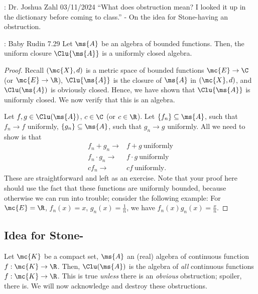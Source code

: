 \begin{nquote}{: Dr. Joshua Zahl 03/11/2024}
    ``What does obstruction mean? I looked it up in the dictionary before coming to class.'' - On the idea for Stone-\Weierstass having an obstruction.
\end{nquote}

\begin{ntheorem}{: Baby Rudin 7.29}
    Let \(\ms{A}\) be an algebra of bounded functions. Then, the uniform closure \(\Clu{\ms{A}}\)  is a uniformly closed algebra.
\end{ntheorem}
\begin{proof}
    Recall \((\mc{X},d)\) is a metric space of bounded functions \(\mc{E}\to\C\) (or \(\mc{E}\to\R\)), \(\Clu{\ms{A}}\) is the closure of \(\ms{A}\) in \((\mc{X},d)\), and \(\Clu(\ms{A})\) is obviously closed. Hence, we have shown that \(\Clu{\ms{A}}\) is uniformly closed. We now verify that this is an algebra.

    \medskip

    Let \(f,g\in\Clu(\ms{A})\), \(c\in\C\) (or \(c\in\R\)). Let \(\{f_n\}\subseteq\ms{A}\), such that \(f_n\to f\) uniformly, \(\{g_n\}\subseteq\ms{A}\), such that \(g_n\to g\) uniformly. All we need to show is that
    \begin{align*} 
        f_n+g_n\to&f+g~\text{uniformly}\\
        f_n\cdot g_n\to&f\cdot g~\text{uniformly}\\
        cf_n\to&cf~\text{uniformly}.
    \end{align*}
    These are straightforward and left as an exercise. Note that your proof here should use the fact that these functions are uniformly bounded, because otherwise we can run into trouble; consider the following example: For \(\mc{E}=\R\), \(f_n(x)=x\), \(g_n(x)=\displaystyle\frac{1}{n}\), we have \(f_n(x)g_n(x)=\displaystyle\frac{x}{n}\).
\end{proof}

\subsection{Idea for Stone-\Weierstass}
Let \(\mc{K}\) be a compact set, \(\ms{A}\) an (real) algebra of continuous function \(f:\mc{K}\to\R\). Then, \(\Clu(\ms{A})\) is the algebra of \emph{all} continuous functions \(f:\mc{K}\to\R\). This is true \emph{unless} there is an \emph{obvious} obstruction; spoiler, there is. We will now acknowledge and destroy these obstructions.


